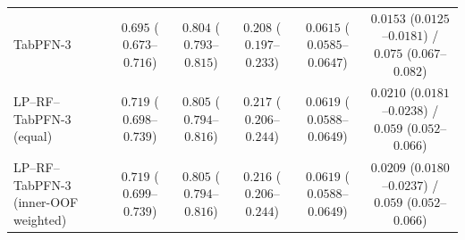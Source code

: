 \begin{table}[!t]
{\begin{tabular}{lccccc}
TabPFN-3 & $0.695$ ($0.673$--$0.716$) & $0.804$ ($0.793$--$0.815$) & $0.208$ ($0.197$--$0.233$) & $0.0615$ ($0.0585$--$0.0647$) & $0.0153$ ($0.0125$--$0.0181$) / $0.075$ ($0.067$--$0.082$) \\
LP--RF--TabPFN-3 (equal) & $0.719$ ($0.698$--$0.739$) & $0.805$ ($0.794$--$0.816$) & $0.217$ ($0.206$--$0.244$) & $0.0619$ ($0.0588$--$0.0649$) & $0.0210$ ($0.0181$--$0.0238$) / $0.059$ ($0.052$--$0.066$) \\
LP--RF--TabPFN-3 (inner-OOF weighted) & $0.719$ ($0.699$--$0.739$) & $0.805$ ($0.794$--$0.816$) & $0.216$ ($0.206$--$0.244$) & $0.0619$ ($0.0588$--$0.0649$) & $0.0209$ ($0.0180$--$0.0237$) / $0.059$ ($0.052$--$0.066$) \\
\bottomrule
\end{tabular}
}
\end{table}
